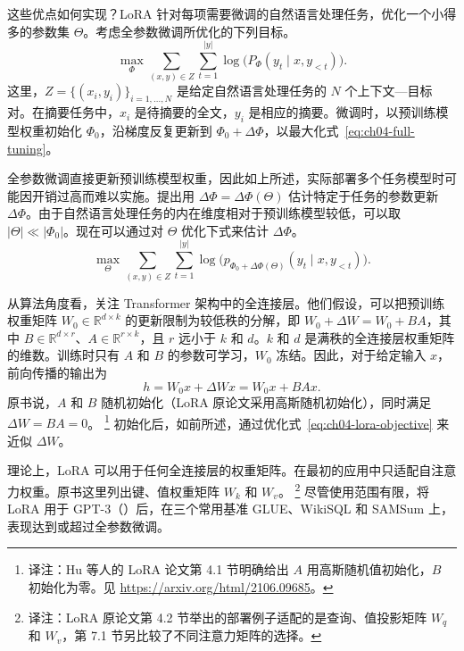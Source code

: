 这些优点如何实现？LoRA 针对每项需要微调的自然语言处理任务，优化一个小得多的参数集 $\Theta$。考虑全参数微调所优化的下列目标。
\begin{equation}
\max_{\Phi}\sum_{(x,y)\in Z}\sum_{t=1}^{|y|}
  \log\bigl(P_{\Phi}(y_t\mid x,y_{<t})\bigr).
\label{eq:ch04-full-tuning}
\end{equation}
这里，$Z=\{(x_i,y_i)\}_{i=1,\ldots,N}$ 是给定自然语言处理任务的 $N$ 个上下文—目标对。在摘要任务中，$x_i$ 是待摘要的全文，$y_i$ 是相应的摘要。微调时，以预训练模型权重初始化 $\Phi_0$，沿梯度反复更新到 $\Phi_0+\Delta\Phi$，以最大化式~\eqref{eq:ch04-full-tuning}。

全参数微调直接更新预训练模型权重，因此如上所述，实际部署多个任务模型时可能因开销过高而难以实施。提出用 $\Delta\Phi=\Delta\Phi(\Theta)$ 估计特定于任务的参数更新 $\Delta\Phi$。由于自然语言处理任务的内在维度相对于预训练模型较低，可以取 $|\Theta|\ll|\Phi_0|$。现在可以通过对 $\Theta$ 优化下式来估计 $\Delta\Phi$。
\begin{equation}
\max_{\Theta}\sum_{(x,y)\in Z}\sum_{t=1}^{|y|}
  \log\bigl(p_{\Phi_0+\Delta\Phi(\Theta)}(y_t\mid x,y_{<t})\bigr).
\label{eq:ch04-lora-objective}
\end{equation}

从算法角度看，关注 Transformer 架构中的全连接层。他们假设，可以把预训练权重矩阵 $W_0\in\mathbb{R}^{d\times k}$ 的更新限制为较低秩的分解，即 $W_0+\Delta W=W_0+BA$，其中 $B\in\mathbb{R}^{d\times r}$、$A\in\mathbb{R}^{r\times k}$，且 $r$ 远小于 $k$ 和 $d$。$k$ 和 $d$ 是满秩的全连接层权重矩阵的维数。训练时只有 $A$ 和 $B$ 的参数可学习，$W_0$ 冻结。因此，对于给定输入 $x$，前向传播的输出为
\begin{equation}
h=W_0x+\Delta W x=W_0x+BAx.
\label{eq:ch04-lora-forward}
\end{equation}
原书说，$A$ 和 $B$ 随机初始化（LoRA 原论文采用高斯随机初始化），同时满足 $\Delta W=BA=0$。%
\footnote{译注：Hu 等人的 LoRA 论文第 4.1 节明确给出 $A$ 用高斯随机值初始化，$B$ 初始化为零。见 \url{https://arxiv.org/html/2106.09685}。}
初始化后，如前所述，通过优化式~\eqref{eq:ch04-lora-objective} 来近似 $\Delta W$。

理论上，LoRA 可以用于任何全连接层的权重矩阵。在最初的应用中只适配自注意力权重。原书这里列出键、值权重矩阵 $W_k$ 和 $W_v$。%
\footnote{译注：LoRA 原论文第 4.2 节举出的部署例子适配的是查询、值投影矩阵 $W_q$ 和 $W_v$，第 7.1 节另比较了不同注意力矩阵的选择。}
尽管使用范围有限，将 LoRA 用于 GPT-3（）后，在三个常用基准 GLUE、WikiSQL 和 SAMSum 上，表现达到或超过全参数微调。

